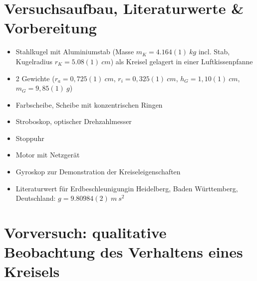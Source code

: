 \documentclass[a4paper,10pt]{article}
\begin{document}
\section[Versuchsaufbau, Literaturwerte \& Vorbereitung]{Versuchsaufbau\fnrefb, Literaturwerte \& Vorbereitung}
\begin{itemize}
\item Stahlkugel mit Aluminiumstab (Masse \(m_K = 4.164(1) \: kg\) incl. Stab, Kugelradius \(r_K=5.08(1)\: cm\)) als Kreisel gelagert in einer Luftkissenpfanne
\item 2 Gewichte (\(r_a=0,725(1)\: cm\),  \(r_i=0,325(1)\: cm\),  \(h_G=1,10(1)\: cm\),  \(m_G=9,85(1)\: g\))
\item Farbscheibe, Scheibe mit konzentrischen Ringen
\item Stroboskop, optischer Drehzahlmesser
\item Stoppuhr
\item Motor mit Netzgerät
\item Gyroskop zur Demonstration der Kreiseleigenschaften
\item Literaturwert für Erdbeschleunigung\fnrefc in Heidelberg, Baden Württemberg, Deutschland: \(g=9.80984(2)\:m\:s^2\)
\end{itemize}

\section{Vorversuch: qualitative Beobachtung des Verhaltens eines Kreisels }
\end{document}
